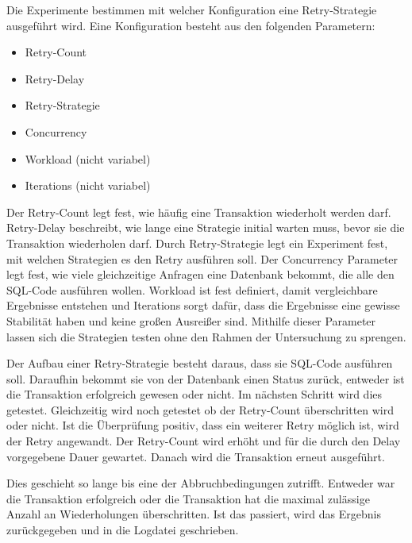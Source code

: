 
Die Experimente bestimmen mit welcher Konfiguration eine Retry-Strategie ausgeführt wird.
Eine Konfiguration besteht aus den folgenden Parametern:
\begin{itemize}
	\item Retry-Count
	\item Retry-Delay
	\item Retry-Strategie
	\item Concurrency
	\item Workload (nicht variabel)
	\item Iterations (nicht variabel)
\end{itemize}
Der Retry-Count legt fest, wie häufig eine Transaktion wiederholt werden darf.
Retry-Delay beschreibt, wie lange eine Strategie initial warten muss, bevor sie die Transaktion wiederholen darf.
Durch Retry-Strategie legt ein Experiment fest, mit welchen Strategien es den Retry ausführen soll.
Der Concurrency Parameter legt fest, wie viele gleichzeitige Anfragen eine Datenbank bekommt, die alle den SQL-Code
ausführen wollen.
Workload ist fest definiert, damit vergleichbare Ergebnisse entstehen und Iterations sorgt dafür, dass die
Ergebnisse eine gewisse Stabilität haben und keine großen Ausreißer sind.
Mithilfe dieser Parameter lassen sich die Strategien testen ohne den Rahmen der Untersuchung zu sprengen.

Der Aufbau einer Retry-Strategie besteht daraus, dass sie SQL-Code ausführen soll.
Daraufhin bekommt sie von der Datenbank einen Status zurück, entweder ist die Transaktion erfolgreich gewesen oder
nicht.
Im nächsten Schritt wird dies getestet.
Gleichzeitig wird noch getestet ob der Retry-Count überschritten wird oder nicht.
Ist die Überprüfung positiv, dass ein weiterer Retry möglich ist, wird der Retry angewandt.
Der Retry-Count wird erhöht und für die durch den Delay vorgegebene Dauer gewartet.
Danach wird die Transaktion erneut ausgeführt.

Dies geschieht so lange bis eine der Abbruchbedingungen zutrifft.
Entweder war die Transaktion erfolgreich oder die Transaktion hat die maximal zulässige Anzahl an Wiederholungen
überschritten.
Ist das passiert, wird das Ergebnis zurückgegeben und in die Logdatei geschrieben.
